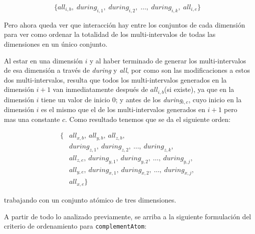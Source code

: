 \[
\{\textit{all}_{i,b},\;\textit{during}_{i,1},\;\textit{during}_{i,2},\;\dots,\;\textit{during}_{i,k},\;\textit{all}_{i,e}\}
\]

Pero ahora queda ver que interacción hay entre los conjuntos de cada dimensión para ver como ordenar la totalidad de los multi-intervalos de todas las dimensiones en un único conjunto.

Al estar en una dimensión $i$ y al haber terminado de generar los multi-intervalos de esa dimensión a través de \textit{during} y \textit{all}, por como son las modificaciones a estos dos multi-intervalos, resulta que todos los multi-intervalos generados en la dimensión $i+1$ van inmediatamente después de $all_{i,b}$(si existe), ya que en la dimensión $i$ tiene un valor de inicio $0$; y antes de los \textit{during}$_{i,c}$, cuyo inicio en la dimensión $i$ es el mismo que el de los multi-intervalos generados en $i+1$ pero mas una constante $c$. Como resultado tenemos que se da el siguiente orden:

\begin{align*}
\{ &\textit{all}_{x,b},\ \textit{all}_{y,b},\ \textit{all}_{z,b}, \\
   &\textit{during}_{z,1},\ \textit{during}_{z,2},\ \dots,\ \textit{during}_{z,k}, \\
   &\textit{all}_{z,e},\ \textit{during}_{y,1},\ \textit{during}_{y,2},\ \dots,\ \textit{during}_{y,j}, \\
   &\textit{all}_{y,e},\ \textit{during}_{x,1},\ \textit{during}_{x,2},\ \dots,\ \textit{during}_{x,j}, \\
   &\textit{all}_{x,e} \}
\end{align*}

trabajando con un conjunto atómico de tres dimensiones.

A partir de todo lo analizado previamente, se arriba a la siguiente formulación del criterio de ordenamiento para \texttt{complementAtom}:

